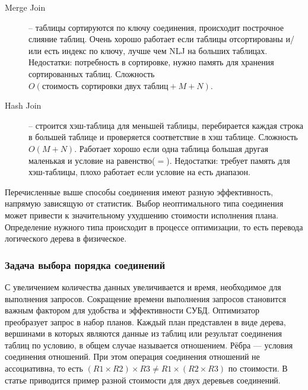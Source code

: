 \documentclass[12pt]{article}
\begin{document}
\begin{flushleft}
\begin{description}
\begin{description}
    \end{description}
    \item[Merge Join] --  таблицы сортируются по ключу соединения, происходит 
    построчное  слияние таблиц. Очень хорошо работает если таблицы отсортированы 
    и/или есть индекс по ключу, лучше чем NLJ на больших таблицах. 
    Недостатки: потребность в сортировке, нужно память для хранения 
    сортированных таблиц. Сложность $O(\text{стоимость сортировки двух таблиц} + M + N)$.
    \item[Hash Join] -- строится хэш-таблица для меньшей таблицы, перебирается 
    каждая строка в большей таблице и проверяется соответствие в хэш таблице. 
    Сложность $O(M+N)$. Работает хорошо если одна таблица большая другая маленькая и 
    условие на равенство($=$). Недостатки: требует память для хэш-таблицы, плохо 
    работает если условие на есть диапазон.
\end{description}
Перечисленные выше способы соединения имеют разную эффективность, напрямую зависящую
от статистик. Выбор неоптимального типа соединения может привести к значительному 
ухудшению стоимости исполнения плана. Определение нужного типа происходит в процессе
оптимизации, то есть перевода логического дерева в физическое.

\centering \subsubsection*{Задача выбора порядка соединений}
\raggedright

С увеличением количества данных увеличивается и время, необходимое для 
выполнения запросов. Сокращение времени выполнения запросов становится важным 
фактором для удобства и эффективности СУБД. Оптимизатор преобразует запрос в набор планов. 
Каждый план представлен в виде дерева, вершинами 
в которых являются данные из таблиц или результат соединения таблиц по условию, 
в общем случае называется отношением. Рёбра — условия соединения отношений.
При этом операция соединения отношений не ассоциативна, то есть
$(R1 \times R2) \times R3 \neq R1 \times (R2 \times R3)$ по стоимости.
В статье  \cite{LiuChang2024} приводится
пример разной стоимости для двух деревьев соединений.
\begin{center}
\end{center}
\end{flushleft}
\end{document}
